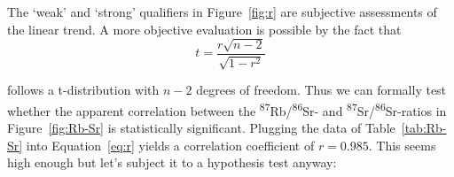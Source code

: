 The `weak' and `strong' qualifiers in Figure~\ref{fig:r} are
subjective assessments of the linear trend. A more objective
evaluation is possible by the fact that
\begin{equation}
  t = \frac{r\sqrt{n-2}}{\sqrt{1-r^2}}
  \label{eq:tr}
\end{equation}

\noindent follows a t-distribution with $n-2$ degrees of freedom. Thus
we can formally test whether the apparent correlation between the
\textsuperscript{87}Rb/\textsuperscript{86}Sr- and
\textsuperscript{87}Sr/\textsuperscript{86}Sr-ratios in
Figure~\ref{fig:Rb-Sr} is statistically significant. Plugging the data
of Table~\ref{tab:Rb-Sr} into Equation~\ref{eq:r} yields a correlation
coefficient of $r = 0.985$.  This seems high enough but let's subject
it to a hypothesis test anyway:

